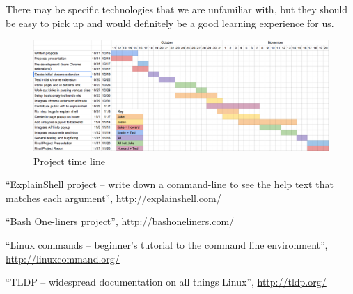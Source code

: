 \documentclass[11pt]{article}
\begin{document}
There may be specific technologies that we are unfamiliar with, but they should be easy to pick up and would definitely be a good learning experience for us.

\begin{landscape}
\thispagestyle{empty}
\begin{figure}[htb]
\vspace*{6em}
\hspace*{-3em}
\centering
\includegraphics[width=1.5\textwidth]{gantt-chart.png}
\caption{Project time line\label{fig:timetable}}
\end{figure}
\end{landscape}

\begin{thebibliography}{9}

  ``ExplainShell project -- write down a command-line to see the help text that 
  matches each argument'',
  \url{http://explainshell.com/}

  ``Bash One-liners project'',
  \url{http://bashoneliners.com/}

  ``Linux commands -- beginner's tutorial to the command line environment'',
  \url{http://linuxcommand.org/}

  ``TLDP -- widespread documentation on all things Linux'',
  \url{http://tldp.org/}

\end{thebibliography}
\end{document}
